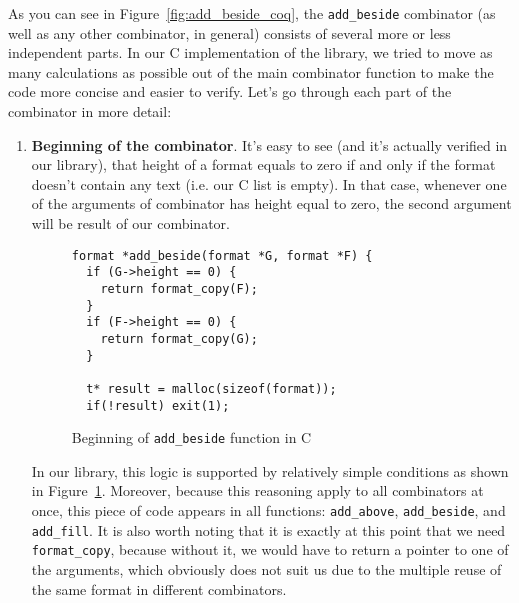 \documentclass[14pt]{constructor-diploma}
\begin{document}
As you can see in Figure~\ref{fig:add_beside_coq}, the \texttt{add\_beside} combinator (as well as any other combinator, in general) 
consists of several more or less independent parts. In our C implementation of the library, we tried to move as many calculations as possible 
out of the main combinator function to make the code more concise and easier to verify. Let's go through each part of the combinator in more detail:
\begin{enumerate}
  \item \textbf{Beginning of the combinator}. It's easy to see (and it's actually verified in our library), that height of a format equals to zero if and only if
  the format doesn't contain any text (i.e. our C list is empty). In that case, whenever one of the arguments of combinator has height
  equal to zero, the second argument will be result of our combinator. 
\begin{figure}[H]
\begin{mdframed}[backgroundcolor=bg]
\begin{verbatim}
format *add_beside(format *G, format *F) {
  if (G->height == 0) {
    return format_copy(F);
  } 
  if (F->height == 0) {
    return format_copy(G);
  }

  t* result = malloc(sizeof(format));
  if(!result) exit(1);
\end{verbatim}
\end{mdframed}
\caption{Beginning of \texttt{add\_beside} function in C}
\label{fig:zero_height_check}
\end{figure}

  In our library, this logic is supported by relatively simple conditions
  as shown in Figure~\ref{fig:zero_height_check}.
  Moreover, because this reasoning apply to all combinators at once, this piece of code appears in all functions: \texttt{add\_above}, \texttt{add\_beside}, and \texttt{add\_fill}. 
  It is also worth noting that it is exactly at this point that we need \texttt{format\_copy}, because without it, 
  we would have to return a pointer to one of the arguments, which obviously does not suit us due to the multiple reuse of the same format in different combinators.


\end{enumerate}
\end{document}
